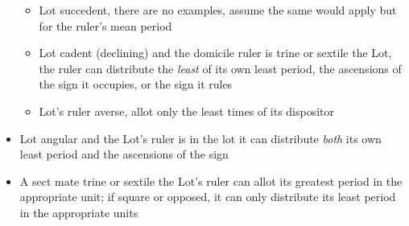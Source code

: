 \begin{mdframed}[backgroundcolor=cyan!05]
\begin{itemize}[itemsep=1pt, topsep=1pt, partopsep=0pt]
\begin{itemize}[itemsep=1pt, topsep=1pt, partopsep=0pt]
\item Lot succedent, there are no examples, assume the same would apply but for the ruler's mean period 
\item Lot cadent (declining) and the domicile ruler is trine or sextile the Lot, the ruler can distribute the \textsl{least} of its own least period, the ascensions of the sign it occupies, or the sign it rules
\item Lot's ruler averse, allot only the least times of its dispositor
\end{itemize}
\item Lot angular and the Lot's ruler is in the lot it can distribute \textsl{both} its own least period and the ascensions of the sign
\item A sect mate trine or sextile the Lot's ruler can allot its greatest period in the appropriate unit; if square or opposed, it can only distribute its least period in the appropriate units
\end{itemize}

\end{mdframed}

\newpage